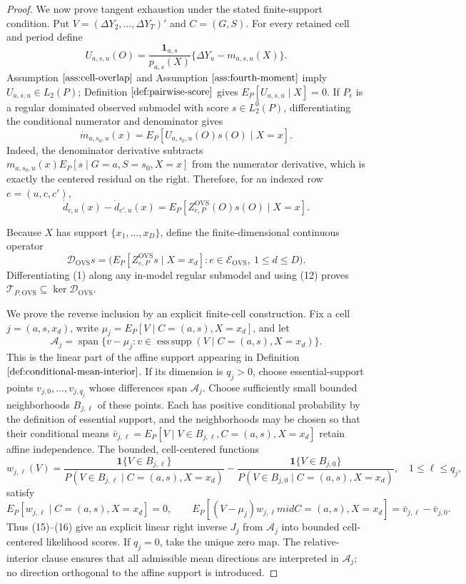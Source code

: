 \documentclass{article}
\begin{document}
\begin{proof}
We now prove tangent exhaustion under the stated finite-support condition.  Put \(V=(\Delta Y_2,\ldots,\Delta Y_T)'\) and \(C=(G,S)\).  For every retained cell and period define
\[
U_{a,s,u}(O)=\frac{\mathbf 1_{a,s}}{p_{a,s}(X)}
\{\Delta Y_u-m_{a,s,u}(X)\}.
\tag{10}
\]
Assumption \(\ref{ass:cell-overlap}\) and Assumption \(\ref{ass:fourth-moment}\) imply \(U_{a,s,u}\in L_2(P)\); Definition \(\ref{def:pairwise-score}\) gives \(E_P[U_{a,s,u}\mid X]=0\).  If \(P_\epsilon\) is a regular dominated observed submodel with score \(s\in L_2^0(P)\), differentiating the conditional numerator and denominator gives
\[
\dot m_{a,s_0,u}(x)
=E_P[U_{a,s_0,u}(O)s(O)\mid X=x].
\tag{11}
\]
Indeed, the denominator derivative subtracts \(m_{a,s_0,u}(x)E_P[s\mid G=a,S=s_0,X=x]\) from the numerator derivative, which is exactly the centered residual on the right.  Therefore, for an indexed row \(e=(u,c,c')\),
\[
\dot d_{c,u}(x)-\dot d_{c',u}(x)
=E_P[Z^{\mathrm{OVS}}_{e,P}(O)s(O)\mid X=x].
\tag{12}
\]

Because \(X\) has support \(\{x_1,\ldots,x_D\}\), define the finite-dimensional continuous operator
\[
\mathscr D_{\mathrm{OVS}}s
=\bigl(E_P[Z^{\mathrm{OVS}}_{e,P}s\mid X=x_d]
 :e\in\mathcal E_{\mathrm{OVS}},\ 1\le d\le D\bigr).
\tag{13}
\]
Differentiating (1) along any in-model regular submodel and using (12) proves
\(\mathcal T_{P,\mathrm{OVS}}\subseteq\ker\mathscr D_{\mathrm{OVS}}\).

We prove the reverse inclusion by an explicit finite-cell construction.  Fix a cell \(j=(a,s,x_d)\), write \(\mu_j=E_P[V\mid C=(a,s),X=x_d]\), and let
\[
\mathcal A_j=\operatorname{span}\{v-\mu_j:v\in
\operatorname{ess\,supp}(V\mid C=(a,s),X=x_d)\}.
\tag{14}
\]
This is the linear part of the affine support appearing in Definition \(\ref{def:conditional-mean-interior}\).  If its dimension is \(q_j>0\), choose essential-support points \(v_{j,0},\ldots,v_{j,q_j}\) whose differences span \(\mathcal A_j\).  Choose sufficiently small bounded neighborhoods \(B_{j,\ell}\) of these points.  Each has positive conditional probability by the definition of essential support, and the neighborhoods may be chosen so that their conditional means \(\bar v_{j,\ell}=E_P[V\mid V\in B_{j,\ell},C=(a,s),X=x_d]\) retain affine independence.  The bounded, cell-centered functions
\[
w_{j,\ell}(V)=
\frac{\mathbf 1\{V\in B_{j,\ell}\}}
{P(V\in B_{j,\ell}\mid C=(a,s),X=x_d)}
-
\frac{\mathbf 1\{V\in B_{j,0}\}}
{P(V\in B_{j,0}\mid C=(a,s),X=x_d)},
\quad 1\le\ell\le q_j,
\tag{15}
\]
satisfy
\[
E_P[w_{j,\ell}\mid C=(a,s),X=x_d]=0,
\qquad
E_P[(V-\mu_j)w_{j,\ell}mid C=(a,s),X=x_d]
=\bar v_{j,\ell}-\bar v_{j,0}.
\tag{16}
\]
Thus (15)--(16) give an explicit linear right inverse \(J_j\) from \(\mathcal A_j\) into bounded cell-centered likelihood scores.  If \(q_j=0\), take the unique zero map.  The relative-interior clause ensures that all admissible mean directions are interpreted in \(\mathcal A_j\); no direction orthogonal to the affine support is introduced.


\end{proof}
\end{document}
